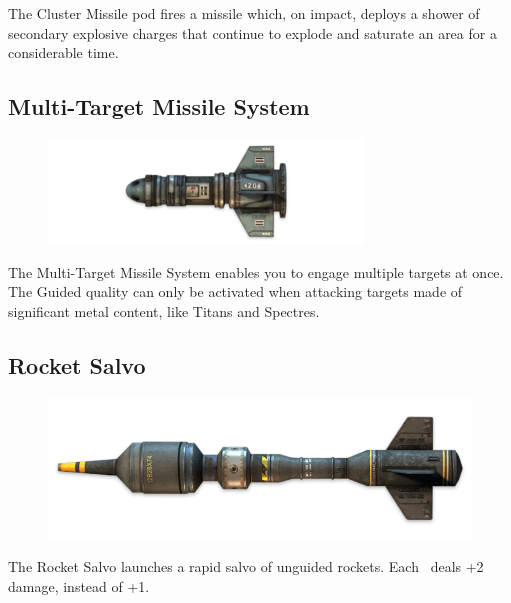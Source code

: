 \documentclass[9pt, openany]{extbook}
\begin{document}
The Cluster Missile pod fires a missile which, on impact, deploys a shower of secondary explosive charges that continue to explode and saturate an area for a considerable time.

\subsection{Multi-Target Missile System}
\begin{figure}
\vspace*{-2em}
\includegraphics[width=\linewidth]{MultiTargetMissileSystem}
\end{figure}

The Multi-Target Missile System enables you to engage multiple targets at once. The Guided quality can only be activated when attacking targets made of significant metal content, like Titans and Spectres.

\subsection{Rocket Salvo}
\begin{figure}
\vspace*{-2em}
\includegraphics[width=\linewidth]{RocketSalvo}
\end{figure}

The Rocket Salvo launches a rapid salvo of unguided rockets. Each \Success\  deals +2 damage, instead of +1.
\end{document}
